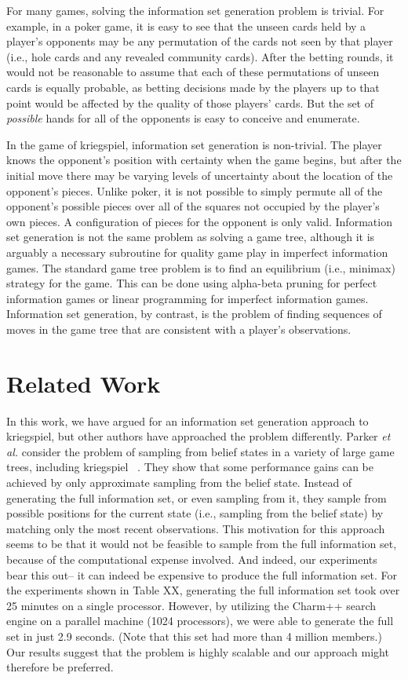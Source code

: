 \documentclass[11pt]{article}
\begin{document}
For many games, solving the information set generation problem is trivial.  For example, in a poker game, it is easy to see that the unseen cards held by a player's opponents may be any permutation of the cards not seen by that player (i.e., hole cards and any revealed community cards).  After the betting rounds, it would not be reasonable to assume that each of these permutations of unseen cards is equally probable, as betting decisions made by the players up to that point would be affected by the quality of those players' cards.  But the set of {\em possible} hands for all of the opponents is easy to conceive and enumerate.

In the game of kriegspiel, information set generation is non-trivial.  The player knows the opponent's position with certainty when the game begins, but after the initial move there may be varying levels of uncertainty about the location of the opponent's pieces.  Unlike poker, it is not possible to simply permute all of the opponent's possible pieces over all of the squares not occupied by the player's own pieces.  A configuration of pieces for the opponent is only valid.
Information set generation is not the same problem as solving a game tree, although it is arguably a necessary subroutine for quality game play in imperfect information games. The standard game tree problem is to find an equilibrium (i.e., minimax) strategy for the game. This can be done using alpha-beta pruning for perfect information games or linear programming for imperfect information games. Information set generation, by contrast, is the problem of finding sequences of moves in the game tree that are consistent with a player's observations.

\section{Related Work}
In this work, we have argued for an information set generation approach to kriegspiel, but other authors have approached the problem differently.  Parker {\em et al.} consider the problem of sampling from belief states in a variety of large game trees, including kriegspiel ~\cite{parker05game}.  They show that some performance gains can be achieved by only approximate sampling from the belief state.  Instead of generating the full information set, or even sampling from it, they sample from possible positions for the current state (i.e., sampling from the belief state) by matching only the most recent observations.  This motivation for this approach seems to be that it would not be feasible to sample from the full information set, because of the computational expense involved.  And indeed, our experiments bear this out-- it can indeed be expensive to produce the full information set.  For the experiments shown in Table XX, generating the full information set took over 25 minutes on a single processor.  However, by utilizing the Charm++ search engine on a parallel machine (1024 processors), we were able to generate the full set in just 2.9 seconds.  (Note that this set had more than 4 million members.)  Our results suggest that the problem is highly scalable and our approach might therefore be preferred.
\end{document}
